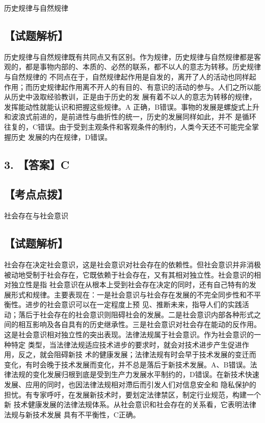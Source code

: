 \documentclass[UTF8,11pt]{ctexart}
\begin{document}
历史规律与自然规律


\subsection*{【试题解析】}

历史规律与自然规律既有共同点又有区别。作为规律，历史规律与自然规律都是客观的，都是事物内部的、本质的、必然的联系，都不以人的意志为转移。历史规律与自然规律的 不同点在于，自然规律起作用是自发的，离开了人的活动也同样起作用；而历史规律起作用离不开人的有目的、有意识的活动的参与。人们之所以能从历史中汲取经验教训，正是由于历史的发 展有着不以人的意志为转移的规律，发挥能动性就能认识和把握这些规律。A 正确，B错误。事物的发展是螺旋式上升和波浪式前进的，是前进性与曲折性的统一，历史的发展同样如此，并不 是循环往复的，C错误。由于受到主观条件和客观条件的制约，人类今天还不可能完全掌握历史 发展的内在规律，D错误。


\subsection*{3. 【答案】C}

\subsection*{【考点点拨】}

社会存在与社会意识


\subsection*{【试题解析】}

社会存在决定社会意识，这是社会意识对社会存在的依赖性。但社会意识并非消极 被动地受制于社会存在，它既依赖于社会存在，又有其相对独立性。社会意识的相对独立性是指 社会意识在从根本上受到社会存在决定的同时，还有自己特有的发展形式和规律。主要表现在：一是社会意识与社会存在发展的不完全同步性和不平衡性。进步的社会意识可以在一定程度上预 见、推断未来，指导人们的实践活动；落后于社会存在的社会意识则阻碍社会的发展。二是社会意识内部各种形式之间的相互影响及各自具有的历史继承性。三是社会意识对社会存在能动的反作用。这是社会意识相对独立性的突出表现。法律法规属于社会意识。作为社会意识的一种特定 类型，当法律法规适应技术进步的要求时，就会对技术进步产生促进作用，反之，就会阻碍新技 术的健康发展；法律法规有时会早于技术发展的变迁而变化，有时会晚于技术发展而变化，并不总是落后于新技术发展。A、B错误。法律法规的变化发展归根到底是受到生产力发展水平制约的，D错误。在新技术快速发展、应用的同时，也因法律法规相对滯后而引发人们对信息安全和 隐私保护的担忧。有专家呼吁，在发展新技术时，要划定法律禁区，制定行业规范，构建一个新 技术健康发展的法律法规体系。从社会意识和社会存在的关系看，它表明法律法规与新技术发展 具有不平衡性，C正确。
\end{document}
